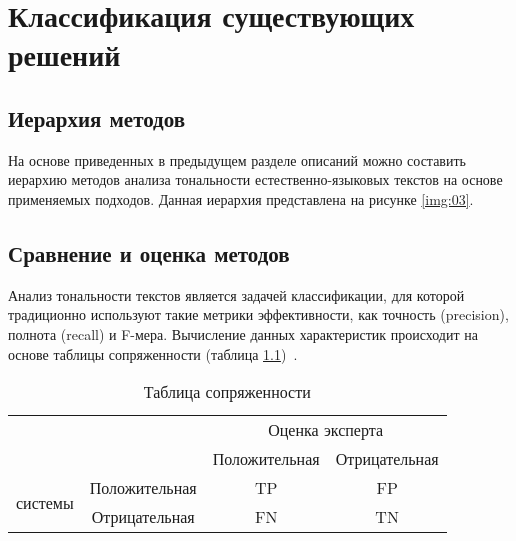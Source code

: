 \chapter{Классификация существующих решений}

\section{Иерархия методов}

На основе приведенных в предыдущем разделе описаний можно составить иерархию
методов анализа тональности естественно-языковых текстов на основе применяемых
подходов. Данная иерархия представлена на рисунке \ref{img:03}.


\section{Сравнение и оценка методов}

Анализ тональности текстов является задачей классификации, для которой
традиционно используют такие метрики эффективности, как точность
(precision), полнота (recall) и F-мера. Вычисление данных
характеристик происходит на основе таблицы сопряженности (таблица
\ref{tab:01})~\cite{article18}. 

\noindent
\begin{table}
\captionsetup{format=hang,justification=raggedright,
              singlelinecheck=off,width=14.6cm}
\begin{center}
\caption{Таблица сопряженности\label{tab:01}}
\begin{tabular}{|c|c|c|c|}
\hline
\multicolumn{2}{|c|}{\multirow{2}{*}{}} & \multicolumn{2}{c|}{Оценка эксперта} \\
\cline{3-4}
\multicolumn{2}{|c|}{} & Положительная & Отрицательная \\
\hline
\multirow{2}{*}{\parbox[c]{2cm}{ системы}} & Положительная & TP & FP \\
\cline{2-4}
                                & Отрицательная & FN & TN \\
\hline
\end{tabular}
\end{center}
\end{table}


